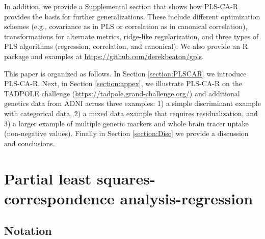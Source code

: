 \documentclass[12pt]{article}
\begin{document}
In addition, we provide a Supplemental section that shows how PLS-CA-R
provides the basis for further generalizations. These include different
optimization schemes (e.g., covariance as in PLS or correlation as in
canonical correlation), transformations for alternate metrics,
ridge-like regularization, and three types of PLS algorithms
(regression, correlation, and canonical). We also provide an R package
and examples at \url{https://github.com/derekbeaton/gpls}.

This paper is organized as follows. In Section \ref{section:PLSCAR} we
introduce PLS-CA-R. Next, in Section \ref{section:appex}, we illustrate
PLS-CA-R on the TADPOLE challenge
(\url{https://tadpole.grand-challenge.org/}) and additional genetics
data from ADNI across three examples: 1) a simple discriminant example
with categorical data, 2) a mixed data example that requires
residualization, and 3) a larger example of multiple genetic markers and
whole brain tracer uptake (non-negative values). Finally in Section
\ref{section:Disc} we provide a discussion and conclusions.

\hypertarget{partial-least-squares-correspondence-analysis-regression}{%
\section{Partial least squares-correspondence
analysis-regression}\label{partial-least-squares-correspondence-analysis-regression}}

\label{section:PLSCAR}

\hypertarget{notation}{%
\subsection{Notation}\label{notation}}
\end{document}

